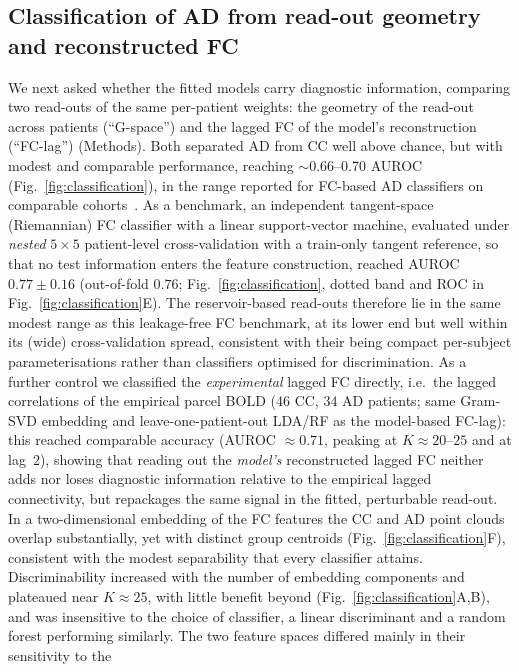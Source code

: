 \documentclass[11pt]{article}
\begin{document}
\subsection*{Classification of AD from read-out geometry and reconstructed FC}
We next asked whether the fitted models carry diagnostic information, comparing
two read-outs of the same per-patient weights: the geometry of the read-out
across patients (``G-space'') and the lagged FC of the model's reconstruction
(``FC-lag'') (Methods). Both separated AD from CC well above
chance, but with modest and comparable performance, reaching $\sim$0.66--0.70
AUROC (Fig.~\ref{fig:classification}), in the range reported for FC-based AD
classifiers on comparable
cohorts~\cite{supekar2008,chen2011,khazaee2015,challis2015}. As a benchmark, an
independent tangent-space (Riemannian) FC classifier with a linear support-vector
machine, evaluated under \emph{nested} $5\times5$ patient-level cross-validation
with a train-only tangent reference, so that no test information enters the
feature construction, reached AUROC $0.77\pm0.16$ (out-of-fold $0.76$;
Fig.~\ref{fig:classification}, dotted band and ROC in
Fig.~\ref{fig:classification}E). The reservoir-based read-outs therefore lie in the
same modest range as this leakage-free FC benchmark, at its lower end but well
within its (wide) cross-validation spread, consistent with their being compact
per-subject parameterisations rather than classifiers optimised for discrimination.
As a further control we classified the \emph{experimental} lagged FC directly,
i.e.\ the lagged correlations of the empirical parcel BOLD ($46$ CC, $34$ AD
patients; same Gram-SVD embedding and leave-one-patient-out LDA/RF as the
model-based FC-lag): this reached comparable accuracy (AUROC $\approx0.71$,
peaking at $K\!\approx\!20$--$25$ and at lag~$2$), showing that reading out the
\emph{model's} reconstructed lagged FC neither adds nor loses diagnostic
information relative to the empirical lagged connectivity, but repackages the
same signal in the fitted, perturbable read-out. In a two-dimensional embedding of the FC features the CC and
AD point clouds overlap substantially, yet with distinct group centroids
(Fig.~\ref{fig:classification}F), consistent with the modest separability that
every classifier attains.
Discriminability increased with the
number of embedding components and plateaued near $K\!\approx\!25$, with little
benefit beyond (Fig.~\ref{fig:classification}A,B), and was insensitive to the
choice of classifier, a linear discriminant and a random forest performing
similarly. The two feature spaces differed mainly in their sensitivity to the
\end{document}
